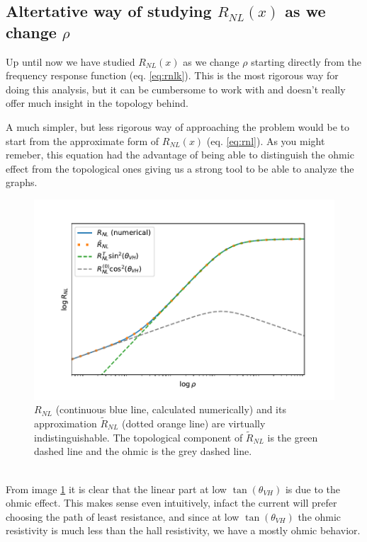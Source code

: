 \subsection{Altertative way of studying $R_{NL}(x)$ as we change $\rho$}
Up until now we have studied $R_{NL}(x)$ as we change $\rho$ starting directly from the frequency response function (eq. \ref{eq:rnlk}). This is the most rigorous way for doing this analysis, but it can be cumbersome to work with and doesn't really offer much insight in the topology behind.

A much simpler, but less rigorous way of approaching the problem would be to start from the approximate form of $R_{NL}(x)$ (eq. \ref{eq:rnl}). As you might remeber, this equation had the advantage of being able to distinguish the ohmic effect from the topological ones giving us a strong tool to be able to analyze the graphs.
\begin{figure}[h!]
    \centering
    \includegraphics[width=\linewidth]{Immagini/rnl/two_approx_rho.pdf}
    \caption{$R_{NL}$ (continuous blue line, calculated numerically) and its approximation $\tilde R_{NL}$ (dotted orange line) are virtually indistinguishable. The topological component of $\tilde R_{NL}$ is the green dashed line and the ohmic is the grey dashed line.}
    \label{fig:two_approx_rho}
\end{figure}\\

From image \ref{fig:two_approx_rho} it is clear that the linear part at low $\tan(\theta_{VH})$ is due to the ohmic effect. This makes sense even intuitively, infact the current will prefer choosing the path of least resistance, and since at low $\tan(\theta_{VH})$ the ohmic resistivity is much less than the hall resistivity, we have a mostly ohmic behavior.


